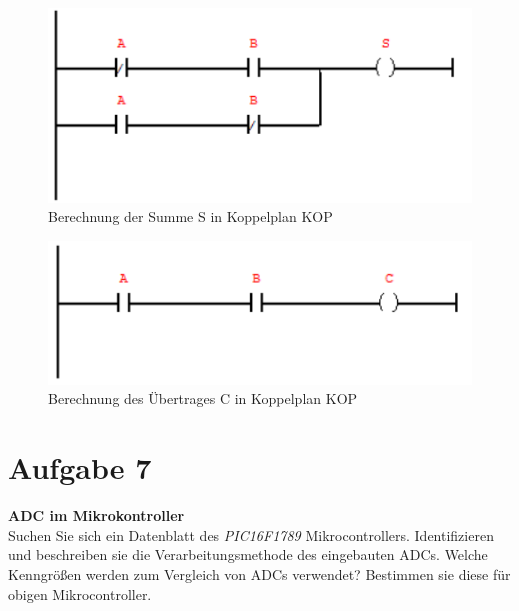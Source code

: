 \documentclass[12pt,a4paper,ngerman]{article}
\begin{document}
\begin{figure}[h!]
\centering
\includegraphics[scale=1]{figures/Aufg6_S_KOP.png} 
\caption{Berechnung der Summe S in Koppelplan KOP}
\end{figure}

\begin{figure}[h!]
\centering
\includegraphics[scale=1]{figures/Aufg6_C_KOP.png} 
\caption{Berechnung des Übertrages C in Koppelplan KOP}
\end{figure}

\pagebreak

\section{Aufgabe 7}

\begin{framed}
\textbf{ADC im Mikrokontroller} \\
Suchen Sie sich ein Datenblatt des \textit{PIC16F1789} Mikrocontrollers. Identifizieren und beschreiben sie die Verarbeitungsmethode des eingebauten ADCs. Welche Kenngrößen werden zum Vergleich von ADCs verwendet? Bestimmen sie diese für obigen Mikrocontroller. 
\end{framed}   
   
   
   
\end{document}
